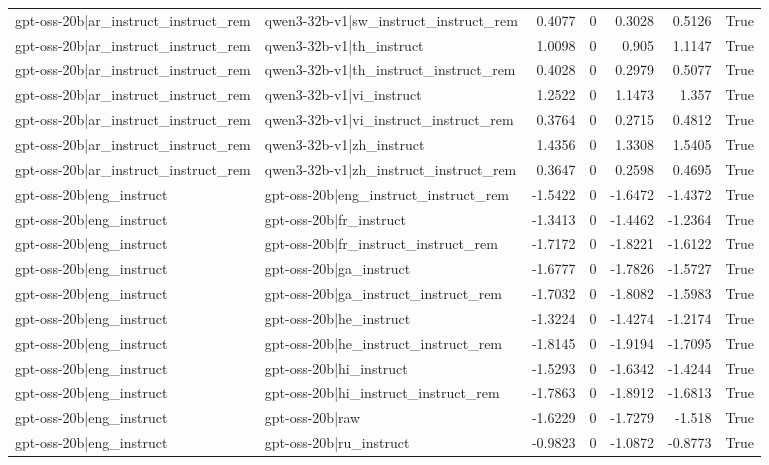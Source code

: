 \begin{table}
\begin{tabular}{l l r r r r l}
gpt-oss-20b|ar_instruct_instruct_rem & qwen3-32b-v1|sw_instruct_instruct_rem & 0.4077 & 0 & 0.3028 & 0.5126 & True \\
gpt-oss-20b|ar_instruct_instruct_rem & qwen3-32b-v1|th_instruct & 1.0098 & 0 & 0.905 & 1.1147 & True \\
gpt-oss-20b|ar_instruct_instruct_rem & qwen3-32b-v1|th_instruct_instruct_rem & 0.4028 & 0 & 0.2979 & 0.5077 & True \\
gpt-oss-20b|ar_instruct_instruct_rem & qwen3-32b-v1|vi_instruct & 1.2522 & 0 & 1.1473 & 1.357 & True \\
gpt-oss-20b|ar_instruct_instruct_rem & qwen3-32b-v1|vi_instruct_instruct_rem & 0.3764 & 0 & 0.2715 & 0.4812 & True \\
gpt-oss-20b|ar_instruct_instruct_rem & qwen3-32b-v1|zh_instruct & 1.4356 & 0 & 1.3308 & 1.5405 & True \\
gpt-oss-20b|ar_instruct_instruct_rem & qwen3-32b-v1|zh_instruct_instruct_rem & 0.3647 & 0 & 0.2598 & 0.4695 & True \\
gpt-oss-20b|eng_instruct & gpt-oss-20b|eng_instruct_instruct_rem & -1.5422 & 0 & -1.6472 & -1.4372 & True \\
gpt-oss-20b|eng_instruct & gpt-oss-20b|fr_instruct & -1.3413 & 0 & -1.4462 & -1.2364 & True \\
gpt-oss-20b|eng_instruct & gpt-oss-20b|fr_instruct_instruct_rem & -1.7172 & 0 & -1.8221 & -1.6122 & True \\
gpt-oss-20b|eng_instruct & gpt-oss-20b|ga_instruct & -1.6777 & 0 & -1.7826 & -1.5727 & True \\
gpt-oss-20b|eng_instruct & gpt-oss-20b|ga_instruct_instruct_rem & -1.7032 & 0 & -1.8082 & -1.5983 & True \\
gpt-oss-20b|eng_instruct & gpt-oss-20b|he_instruct & -1.3224 & 0 & -1.4274 & -1.2174 & True \\
gpt-oss-20b|eng_instruct & gpt-oss-20b|he_instruct_instruct_rem & -1.8145 & 0 & -1.9194 & -1.7095 & True \\
gpt-oss-20b|eng_instruct & gpt-oss-20b|hi_instruct & -1.5293 & 0 & -1.6342 & -1.4244 & True \\
gpt-oss-20b|eng_instruct & gpt-oss-20b|hi_instruct_instruct_rem & -1.7863 & 0 & -1.8912 & -1.6813 & True \\
gpt-oss-20b|eng_instruct & gpt-oss-20b|raw & -1.6229 & 0 & -1.7279 & -1.518 & True \\
gpt-oss-20b|eng_instruct & gpt-oss-20b|ru_instruct & -0.9823 & 0 & -1.0872 & -0.8773 & True \\

\end{tabular}
\end{table}
